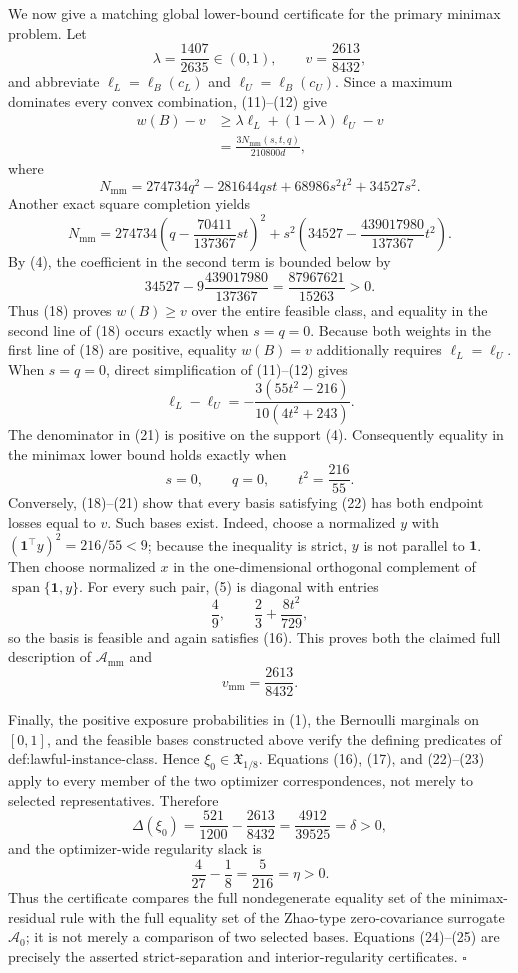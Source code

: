 We now give a matching global lower-bound certificate for the primary minimax problem.  Let
\[
 \lambda=\frac{1407}{2635}\in(0,1),
 \qquad
 v=\frac{2613}{8432},
\]
and abbreviate \(\ell_L=\ell_B(c_L)\) and \(\ell_U=\ell_B(c_U)\).  Since a maximum dominates every convex combination, (11)--(12) give
\[
 \begin{split}
 w(B)-v
 &\ge \lambda\ell_L+(1-\lambda)\ell_U-v\\
 &=\frac{3N_{\mathrm{mm}}(s,t,q)}{210800d},
 \end{split}
 \tag{18}
\]
where
\[
 N_{\mathrm{mm}}
 =274734q^2-281644qst+68986s^2t^2+34527s^2.
\]
Another exact square completion yields
\[
 N_{\mathrm{mm}}
 =274734\left(q-\frac{70411}{137367}st\right)^2
 +s^2\left(34527-\frac{439017980}{137367}t^2\right).
 \tag{19}
\]
By (4), the coefficient in the second term is bounded below by
\[
 34527-9\frac{439017980}{137367}
 =\frac{87967621}{15263}>0.
 \tag{20}
\]
Thus (18) proves \(w(B)\ge v\) over the entire feasible class, and equality in the second line of (18) occurs exactly when \(s=q=0\).  Because both weights in the first line of (18) are positive, equality \(w(B)=v\) additionally requires \(\ell_L=\ell_U\).  When \(s=q=0\), direct simplification of (11)--(12) gives
\[
 \ell_L-\ell_U
 =-\frac{3(55t^2-216)}{10(4t^2+243)}.
 \tag{21}
\]
The denominator in (21) is positive on the support (4).  Consequently equality in the minimax lower bound holds exactly when
\[
 s=0,
 \qquad q=0,
 \qquad t^2=\frac{216}{55}.
 \tag{22}
\]
Conversely, (18)--(21) show that every basis satisfying (22) has both endpoint losses equal to \(v\).  Such bases exist.  Indeed, choose a normalized \(y\) with \((\mathbf1^{\top}y)^2=216/55<9\); because the inequality is strict, \(y\) is not parallel to \(\mathbf1\).  Then choose normalized \(x\) in the one-dimensional orthogonal complement of \(\operatorname{span}\{\mathbf1,y\}\).  For every such pair, (5) is diagonal with entries
\[
 \frac49,
 \qquad
 \frac23+\frac{8t^2}{729},
\]
so the basis is feasible and again satisfies (16).  This proves both the claimed full description of \(\mathcal A_{\mathrm{mm}}\) and
\[
 v_{\mathrm{mm}}=\frac{2613}{8432}.
 \tag{23}
\]

Finally, the positive exposure probabilities in (1), the Bernoulli marginals on \([0,1]\), and the feasible bases constructed above verify the defining predicates of def:lawful-instance-class.  Hence \(\xi_0\in\mathfrak X_{1/8}\).  Equations (16), (17), and (22)--(23) apply to every member of the two optimizer correspondences, not merely to selected representatives.  Therefore
\[
 \Delta(\xi_0)
 =\frac{521}{1200}-\frac{2613}{8432}
 =\frac{4912}{39525}=\delta>0,
 \tag{24}
\]
and the optimizer-wide regularity slack is
\[
 \frac4{27}-\frac18=\frac5{216}=\eta>0.
 \tag{25}
\]
Thus the certificate compares the full nondegenerate equality set of the minimax-residual rule with the full equality set of the Zhao-type zero-covariance surrogate \(\mathcal A_0\); it is not merely a comparison of two selected bases.  Equations (24)--(25) are precisely the asserted strict-separation and interior-regularity certificates. \(\square\)